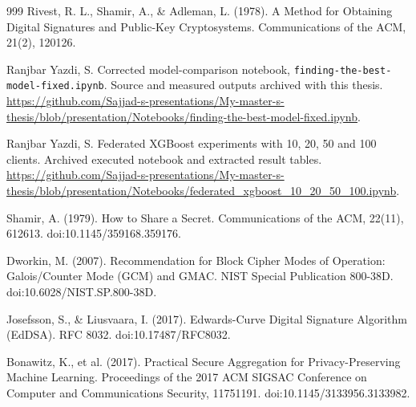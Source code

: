 \begin{thebibliography}{999}
 Rivest, R. L., Shamir, A., \& Adleman, L. (1978). A Method for Obtaining Digital Signatures and Public-Key Cryptosystems. Communications of the ACM, 21(2), 120\lr{--}126.

 Ranjbar Yazdi, S. Corrected model-comparison notebook, \texttt{finding-the-best-model-fixed.ipynb}. Source and measured outputs archived with this thesis. \url{https://github.com/Sajjad-s-presentations/My-master-s-thesis/blob/presentation/Notebooks/finding-the-best-model-fixed.ipynb}.

 Ranjbar Yazdi, S. Federated XGBoost experiments with 10, 20, 50 and 100 clients. Archived executed notebook and extracted result tables. \url{https://github.com/Sajjad-s-presentations/My-master-s-thesis/blob/presentation/Notebooks/federated_xgboost_10_20_50_100.ipynb}.

 Shamir, A. (1979). How to Share a Secret. Communications of the ACM, 22(11), 612\lr{--}613. doi:10.1145/359168.359176.

 Dworkin, M. (2007). Recommendation for Block Cipher Modes of Operation: Galois/Counter Mode (GCM) and GMAC. NIST Special Publication 800-38D. doi:10.6028/NIST.SP.800-38D.

 Josefsson, S., \& Liusvaara, I. (2017). Edwards-Curve Digital Signature Algorithm (EdDSA). RFC 8032. doi:10.17487/RFC8032.

 Bonawitz, K., et al. (2017). Practical Secure Aggregation for Privacy-Preserving Machine Learning. Proceedings of the 2017 ACM SIGSAC Conference on Computer and Communications Security, 1175\lr{--}1191. doi:10.1145/3133956.3133982.

\end{thebibliography}
